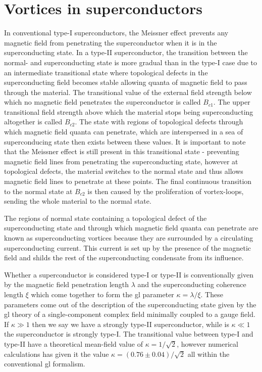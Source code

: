\chapter{Vortices in superconductors}
\label{sec:Vor}

In conventional type-I superconductors, the Meissner effect prevents any magnetic field from penetrating the superconductor when it is in the
superconducting state. In a type-II superconductor, the transition between the normal- and superconducting state is more gradual than in the type-I case
due to an intermediate transitional state where topological defects in the superconducting field  becomes stable allowing quanta of magnetic field
to pass through the material. The transitional value of the external field strength below which no magnetic field penetrates the superconductor is
called $B_{c1}$. The upper transitional field strength above which the material stops being superconducting altogether is called $B_{c2}$. The state
with regions of topological defects through which magnetic field quanta can penetrate, which are interspersed in a sea of
superconducing state then exists between these values. It is important to note that the Meissner effect is still present in this transitional state - preventing magnetic field
lines from penetrating the superconducting state, however at topological defects, the material switches to the normal state and thus
allows magnetic field lines to penetrate at these points. The final continuous transition to the normal state at $B_{c2}$ is then caused by the
proliferation of vortex-loops, sending the whole material to the normal state.

The regions of normal state containing a topological defect of the superconducting state and through which magnetic field quanta can penetrate are known
as superconducting vortices because they are surrounded by a circulating superconducting current. This current is set up by the presence of the magnetic field
and shilds the rest of the superconducting condensate from its influence.

Whether a superconductor is considered type-I or type-II is conventionally given by the magnetic field penetration length $\lambda$ and the superconducting
coherence length $\xi$ which come together to form the \ac{gl} parameter $\kappa = \lambda/\xi$.
These parameters come out of the description of the superconducting state given by the \ac{gl} theory of a single-component complex field minimally coupled
to a gauge field.
If $\kappa\gg1$ then we say we have a strongly
type-II superconductor, while is $\kappa\ll1$ the superconductor is strongly type-I. The transitional value between type-I and type-II have a theoretical
mean-field value of $\kappa = 1/\sqrt{2}$, however numerical calculations has given it the value $\kappa = (0.76\pm0.04)/\sqrt{2}$ all within the conventional
\ac{gl} formalism.

